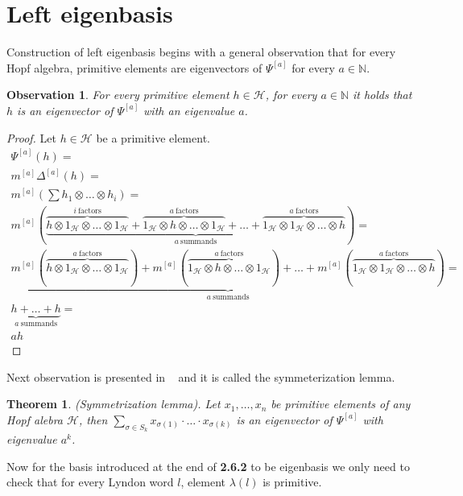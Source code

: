 \documentclass[a4paper, 12pt]{report}
\newtheorem{observation}{Observation}
\newtheorem{theorem}{Theorem}
\begin{document}
\section{Left eigenbasis}
Construction of left eigenbasis begins with a general observation that for every Hopf algebra,
primitive elements are eigenvectors of $\Psi^{[a]}$ for every $a \in \mathbb{N}$.
\begin{observation}
For every primitive element $h \in \mathcal{H}$, for every $a \in \mathbb{N}$ it holds that $h$ is an
eigenvector of $\Psi^{[a]}$ with an eigenvalue $a$.
\end{observation}
\begin{proof}
Let $h \in \mathcal{H}$ be a primitive element.
\begin{gather*}
\Psi^{[a]}(h) = \\ m^{[a]}\Delta^{[a]}(h) = \\
m^{[a]}(\sum h_1 \otimes \dots \otimes h_i) = \\
m^{[a]}(\underbrace{\overbrace{h \otimes 1_\mathcal{H} \otimes \dots \otimes 1_\mathcal{H}}^{i\
\mathrm{factors}} +
\overbrace{1_\mathcal{H} \otimes h \otimes \dots \otimes 1_\mathcal{H}}^{a\ \mathrm{factors}} +
\dots +
\overbrace{1_\mathcal{H} \otimes 1_\mathcal{H} \otimes \dots \otimes h}^{a\ \mathrm{factors}}}_{a\
\mathrm{summands}} ) = \\
\underbrace{m^{[a]}(\overbrace{h \otimes 1_\mathcal{H} \otimes \dots \otimes 1_\mathcal{H}}^{a\
\mathrm{factors}}) +
m^{[a]}(\overbrace{1_\mathcal{H} \otimes h \otimes \dots \otimes 1_\mathcal{H}}^{a\ \mathrm{factors}}) +
\dots +
m^{[a]}(\overbrace{1_\mathcal{H} \otimes 1_\mathcal{H} \otimes \dots \otimes h}^{a\ \mathrm{factors}})}_{a\
\mathrm{summands}} = \\
\underbrace{h + \dots + h}_{a\ \mathrm{summands}} = \\
ah
\end{gather*}

\end{proof}
Next observation is presented in ~\cite{Diaconis2014} and it is called the symmeterization lemma.
\begin{theorem}
(Symmetrization lemma). Let $x_1, \dots, x_n$ be primitive elements of any Hopf alebra $\mathcal{H}$, then
$\displaystyle\sum_{\sigma \in S_k} x_{\sigma(1)}\cdot\ldots\cdot x_{\sigma(k)}$ is an eigenvector of
$\Psi^{[a]}$ with eigenvalue $a^k$.
\end{theorem}

Now for the basis introduced at the end of \textbf{2.6.2} to be eigenbasis we only need to check that for
every Lyndon
word $l$, element $\lambda(l)$ is primitive.
\end{document}
